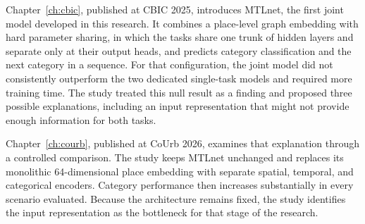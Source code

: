 Chapter~\ref{ch:cbic}, published at CBIC 2025, introduces MTLnet, the first joint model
developed in this research. It combines a place-level graph embedding with hard
parameter sharing, in which the tasks share one trunk of hidden layers and separate
only at their output heads, and predicts category classification and the next category
in a sequence. For that configuration, the joint model did not consistently outperform
the two dedicated single-task models and required more training time. The study
treated this null result as a finding and proposed three possible explanations,
including an input representation that might not provide enough information for both
tasks.

Chapter~\ref{ch:courb}, published at CoUrb 2026, examines that explanation through a
controlled comparison. The study keeps MTLnet unchanged and replaces its monolithic
64-dimensional place embedding with separate spatial, temporal, and categorical
encoders. Category performance then increases substantially in every scenario evaluated.
Because the architecture remains fixed, the study identifies the input representation
as the bottleneck for that stage of the research.

